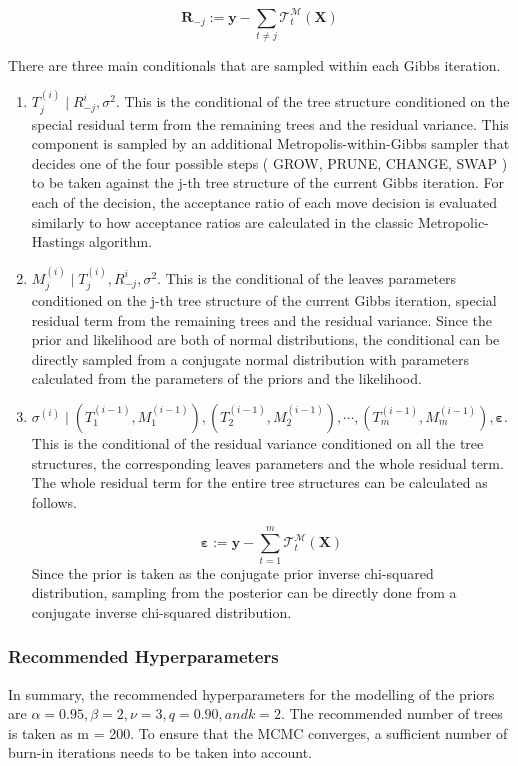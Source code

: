 \documentclass{usiinftr}
\begin{document}
\begin{equation}
\boldsymbol{R}_{-j}:=\boldsymbol{y}-\sum_{t \neq j} \mathcal{T}_{t}^{\mathcal{M}}(\boldsymbol{X})
\end{equation}

There are three main conditionals that are sampled within each Gibbs iteration.

\begin{enumerate}
\item $ T_j^{(i)} \mid R_{-j}^i, \sigma^2 $. This is the conditional of the tree structure conditioned on the special residual term from the remaining trees and the residual variance. This component is sampled by an additional Metropolis-within-Gibbs sampler that decides one of the four possible steps ( GROW, PRUNE, CHANGE, SWAP ) to be taken against the j-th tree structure of the current Gibbs iteration. For each of the decision, the acceptance ratio of each move decision is evaluated similarly to how acceptance ratios are calculated in the classic Metropolic-Hastings algorithm.
\item $ M_j^{(i)} \mid T_j^{(i)}, R_{-j}^i, \sigma^2 $. This is the conditional of the leaves parameters conditioned on the j-th tree structure of the current Gibbs iteration, special residual term from the remaining trees and the residual variance. Since the prior and likelihood are both of normal distributions, the conditional can be directly sampled from a conjugate normal distribution with parameters calculated from the parameters of the priors and the likelihood.
\item $\sigma^(i) \mid (T_1^{(i-1)},M_1^{(i-1)}),(T_2^{(i-1)},M_2^{(i-1)}), \cdots, (T_m^{(i-1)},M_m^{(i-1)}), \boldsymbol{\varepsilon}  $. This is the conditional of the residual variance conditioned on all the tree structures, the corresponding leaves parameters and the whole residual term. The whole residual term for the entire tree structures can be calculated as follows.

\begin{equation}
\boldsymbol{\varepsilon}:=\boldsymbol{y}-\sum_{t=1}^m \mathcal{T}_{t}^{\mathcal{M}}(\boldsymbol{X})
\end{equation}
Since the prior is taken as the conjugate prior inverse chi-squared distribution, sampling from the posterior can be directly done from a conjugate inverse chi-squared distribution.
\end{enumerate}

\subsubsection{Recommended Hyperparameters}\label{rec}
In summary, the recommended hyperparameters for the modelling of the priors are  $\alpha = 0.95, \beta =2, \nu = 3, q = 0.90, and k = 2$. The recommended number of trees is taken as m = 200. To ensure that the MCMC converges, a sufficient number of burn-in iterations needs to be taken into account.
\end{document}
